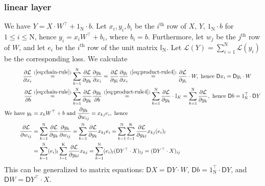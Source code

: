 \documentclass{article}
\newcommand{\const}[1]{\ensuremath{\mathrm{#1}}} %
\newcommand{\Gradient}{\textsf{D}}
\newcommand{\Derivative}[2]{\ensuremath{\frac{\partial #1}{\partial #2}}}
\begin{document}
\subsubsection*{linear layer}
We have $Y = X \cdot W^\top + 1_\const{N} \cdot b$. Let $x_i, y_i, b_i$ be the $i^\text{th}$ row of $X$, $Y$, $1_\const{N} \cdot b$ for $1 \leq i \leq \const{N}$, hence $y_i = x_i W^\top + b_i$, where $b_i = b$. Furthermore, let $w_j$ be the $j^\text{th}$ row of $W$, and let $e_i$ be the $i^\text{th}$ row of the unit matrix $\mathbb{I}_\const{N}$. Let $\mathcal{L}(Y) = \sum_{i=1}^\const{N} \mathcal{L}(y_i)$ be the corresponding loss. We calculate
\begin{align}
\begin{split}
  \Derivative{\mathcal{L}}{x_i} 
  &\overset{(\ref{eq:chain-rule})}{=} \sum_{k=1}^\const{N} \Derivative{\mathcal{L}}{y_k} \Derivative{y_k}{x_i}
  = \Derivative{\mathcal{L}}{y_i} \Derivative{y_i}{x_i}
  \overset{(\ref{eq:product-rule4})}{=} \Derivative{\mathcal{L}}{y_i} \cdot W,
  \text{ hence } \Gradient{x_i} = \Gradient{y_i} \cdot W
  \\
  \Derivative{\mathcal{L}}{b} 
  &\overset{(\ref{eq:chain-rule})}{=} \sum_{k=1}^\const{N} \Derivative{\mathcal{L}}{y_k} \Derivative{y_k}{b}
  \overset{(\ref{eq:product-rule4})}{=} \sum_{k=1}^\const{N} \Derivative{\mathcal{L}}{y_k} \cdot \mathbb{I}_K
  = \sum_{k=1}^\const{N} \Derivative{\mathcal{L}}{y_k}, 
  \text{ hence } \Gradient{b} = 1_\const{N}^\top \cdot \Gradient{Y}
  \\
  \text{We have } y_k &= x_k W^\top + b \text{ and } \Derivative{y_k}{w_{ij}} = x_{kj} e_i, \text{ hence}
  \\
  \Derivative{\mathcal{L}}{w_{ij}} 
  &= \sum_{k=1}^\const{N} \Derivative{\mathcal{L}}{y_k} \Derivative{y_k}{w_{ij}}
  = \sum_{k=1}^\const{N} \Derivative{\mathcal{L}}{y_k} x_{kj} e_i
  = \sum_{k=1}^\const{N} \sum_{l=1}^\const{K}
    \Derivative{\mathcal{L}}{y_{kl}} 
    x_{kj} (e_i)_l
  \\  
  &= \sum_{k=1}^\const{N} (e_i)_l
    \sum_{l=1}^\const{K}
    \Derivative{\mathcal{L}}{y_{kl}} x_{kj}
  = \sum_{k=1}^\const{N} (e_i)_l
    (\Gradient{Y}^\top \cdot X)_{lj}
  = (\Gradient{Y}^\top \cdot X)_{ij}
\end{split}  
\end{align}
This can be generalized to matrix equations: $\Gradient{X} = \Gradient{Y} \cdot W$, $\Gradient{b} = 1_\const{N}^\top \cdot \Gradient{Y}$, and $\Gradient{W} = \Gradient Y^\top \cdot X$.
\end{document}
